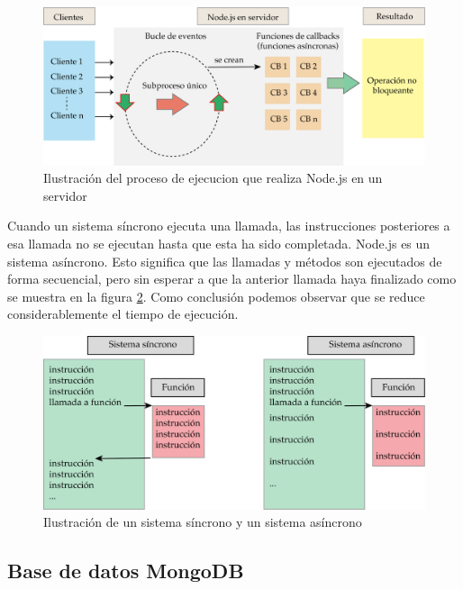 \begin{figure}[htpb]
	\centering
	\includegraphics[scale=.65]{./Figures/node-esquema.png}
	\caption[Ejecución de Node.js en servidor ]{Ilustración del proceso de ejecucion que realiza Node.js en un servidor}
	\label{fig:node-esquema}
\end{figure}

Cuando un sistema síncrono ejecuta una llamada, las instrucciones posteriores a esa llamada no se ejecutan hasta que esta ha sido completada. Node.js es un sistema asíncrono. Esto significa que las llamadas y métodos son
ejecutados de forma secuencial, pero sin esperar a que la anterior llamada haya finalizado como se muestra en la figura \ref{fig:sinc-async}. Como conclusión podemos observar que se reduce considerablemente el tiempo de ejecución.

\begin{figure}[htpb]
	\centering
	\includegraphics[scale=.65]{./Figures/funciones-asinc.png}
	\caption[Funciones síncronas y asíncronas ]{Ilustración de un sistema síncrono y un sistema asíncrono}
	\label{fig:sinc-async}
\end{figure}


\subsection{Base de datos MongoDB}

